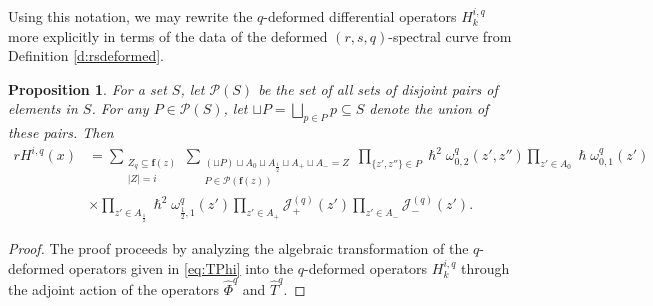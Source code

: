 \documentclass[reqno,11pt]{amsart}
\theoremstyle{plain}
\newtheorem{proposition}[theorem]{Proposition}
\theoremstyle{definition}
\theoremstyle{remark}
\numberwithin{equation}{section}
\newcommand{\1}{\mathds{1}}
\newcommand{\2}{\frac{1}{2}}
\begin{document}
{								Using this notation, we may rewrite the $q$-deformed differential  operators $H^{i,q}_k$ more explicitly in terms of the data of the deformed $(r,s,q)$-spectral curve from Definition \ref{d:rsdeformed}.
								\begin{proposition}\label{p:hh}
									For a set $ S$, let $\mathcal{P}(S)$ be the set of all sets of disjoint pairs of elements in $ S$. For any  $ P \in \mathcal{P}(S) $, let $ \sqcup P = \bigsqcup_{p \in P} p \subseteq S$ denote the union of these pairs. Then
									\begin{align}
										rH^{i,q}(x) 
										&= 
										\sum_{\substack{Z_q \subseteq \mathbf{f}(z)\\ |Z| = i}} 
										\sum_{\substack{(\sqcup P) \sqcup A_0 \sqcup A_{\frac{1}{2}} \sqcup A_+ \sqcup A_- = Z \\ P \in \mathcal{P}(\mathbf{f}(z))}}
										\prod_{\{ z', z''\} \in P} \hslash^2 \omega^{q}_{0,2}(z',z'') 
										\prod_{z' \in A_0} \hslash \omega^{q}_{0,1} (z') 
										\nonumber\\
										&\times
										\prod_{z' \in A_{\frac{1}{2}}} \hslash^2 \omega^{q}_{\frac{1}{2},1}(z') 
										\prod_{z' \in A_+} \mathcal{J}^{(q)}_{+} (z') 
										\prod_{z' \in A_-} \mathcal{J}^{(q)}_{-} (z').
									\end{align}
								\end{proposition}
								\begin{proof}
									{The proof proceeds by analyzing the algebraic transformation of the $q$-deformed operators given in \eqref{eq:TPhi} into the $q$-deformed operators $H^{i,q}_k$ through the adjoint action of the operators $\hat{\Phi}^q$ and $\hat{T}^q$.}
									

\end{proof}}
\end{document}
